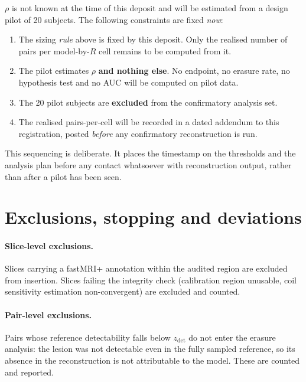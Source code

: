 \documentclass[11pt,a4paper]{article}
\begin{document}
$\rho$ is not known at the time of this deposit and will be estimated from a
design pilot of 20 subjects. The following constraints are fixed \emph{now}:

\begin{enumerate}[leftmargin=2em]
\item The sizing \emph{rule} above is fixed by this deposit. Only the realised
number of pairs per model-by-$R$ cell remains to be computed from it.
\item The pilot estimates $\rho$ \textbf{and nothing else}. No endpoint, no
erasure rate, no hypothesis test and no AUC will be computed on pilot data.
\item The 20 pilot subjects are \textbf{excluded} from the confirmatory
analysis set.
\item The realised pairs-per-cell will be recorded in a dated addendum to this
registration, posted \emph{before} any confirmatory reconstruction is run.
\end{enumerate}

This sequencing is deliberate. It places the timestamp on the thresholds and
the analysis plan before any contact whatsoever with reconstruction output,
rather than after a pilot has been seen.

\section{Exclusions, stopping and deviations}

\paragraph{Slice-level exclusions.} Slices carrying a fastMRI+ annotation
within the audited region are excluded from insertion. Slices failing the
integrity check (calibration region unusable, coil sensitivity estimation
non-convergent) are excluded and counted.

\paragraph{Pair-level exclusions.} Pairs whose reference detectability falls
below $z_{\mathrm{det}}$ do not enter the erasure analysis: the lesion was not
detectable even in the fully sampled reference, so its absence in the
reconstruction is not attributable to the model. These are counted and
reported.
\end{document}
